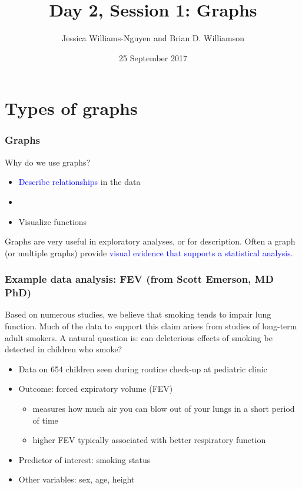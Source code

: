 \documentclass[11pt, hyperref={colorlinks, urlcolor=blue}]{beamer}
\title{Day 2, Session 1: Graphs}
\author{Jessica Williams-Nguyen and Brian D. Williamson}
\institute{EPI/BIOST Bootcamp 2017}
\date{25 September 2017}
\newcommand{\myframe}[1]{\begin{frame} \frametitle{#1}}
\newenvironment{spaceitemize}
{ \begin{itemize}
    \setlength{\itemsep}{10pt}
    \setlength{\parskip}{0pt}
    \setlength{\parsep}{0pt}     }
{ \end{itemize}                  }
\begin{document}
\begin{frame}
\titlepage
\end{frame}

\section{Types of graphs}
\myframe{Graphs}
Why do we use graphs?
\begin{itemize}
\item \textcolor{blue}{Describe relationships} in the data
\item[]
\item Visualize functions
\end{itemize}

Graphs are very useful in exploratory analyses, or for description. Often a graph (or multiple graphs) provide \textcolor{blue}{visual evidence that supports a statistical analysis}.

\end{frame}

\myframe{Example data analysis: FEV \small (from Scott Emerson, MD PhD)}
Based on numerous studies, we believe that smoking tends to impair lung function. Much of the data to support this claim arises from studies of long-term adult smokers. A natural question is: can deleterious effects of smoking be detected in children who smoke?
\begin{spaceitemize}
\item Data on 654 children seen during routine check-up at pediatric clinic
\item Outcome: forced expiratory volume (FEV)
\begin{itemize}
\item measures how much air you can blow out of your lungs in a short period of time
\item higher FEV typically associated with better respiratory function
\end{itemize}
\item Predictor of interest: smoking status
\item Other variables: sex, age, height
\end{spaceitemize}
\end{frame}
\end{document}
